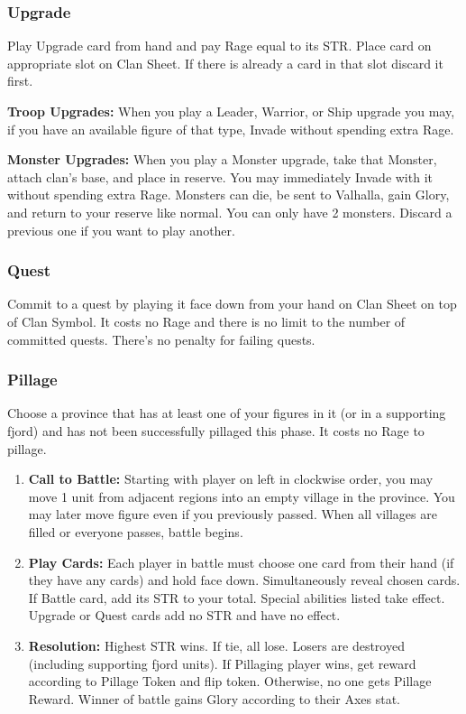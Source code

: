 \documentclass[12pt]{article}
\newenvironment{enumerateCustom}
{\begin{enumerate}
  \setlength{\itemsep}{1pt}
  \setlength{\parskip}{0pt}
  \setlength{\parsep}{0pt}}
{\end{enumerate}}
\begin{document}
\begin{multicols*}{2}
    \subsubsection*{Upgrade}
    Play Upgrade card from hand and pay Rage equal to its STR. Place card on appropriate slot on Clan Sheet. If there is already a card in that slot discard it first.

    \textbf{Troop Upgrades:} When you play a Leader, Warrior, or Ship upgrade you may, if you have an available figure of that type, Invade without spending extra Rage.

    \textbf{Monster Upgrades:} When you play a Monster upgrade, take that Monster, attach clan's base, and place in reserve. You may immediately Invade with it without spending extra Rage. Monsters can die, be sent to Valhalla, gain Glory, and return to your reserve like normal. You can only have 2 monsters. Discard a previous one if you want to play another.

    \subsubsection*{Quest}
    Commit to a quest by playing it face down from your hand on Clan Sheet on top of Clan Symbol. It costs no Rage and there is no limit to the number of committed quests. There's no penalty for failing quests.

    \subsubsection*{Pillage}
    Choose a province that has at least one of your figures in it (or in a supporting fjord) and has not been successfully pillaged this phase. It costs no Rage to pillage.

    \begin{enumerateCustom}
    \item \textbf{Call to Battle:} Starting with player on left in clockwise order, you may move 1 unit from adjacent regions into an empty village in the province. You may later move figure even if you previously passed. When all villages are filled or everyone passes, battle begins.
    \item \textbf{Play Cards:} Each player in battle must choose one card from their hand (if they have any cards) and hold face down. Simultaneously reveal chosen cards. If Battle card, add its STR to your total. Special abilities listed take effect. Upgrade or Quest cards add no STR and have no effect.
    \item \textbf{Resolution:} Highest STR wins. If tie, all lose. Losers are destroyed (including supporting fjord units). If Pillaging player wins, get reward according to Pillage Token and flip token. Otherwise, no one gets Pillage Reward. Winner of battle gains Glory according to their Axes stat.
    \end{enumerateCustom}


\end{multicols*}
\end{document}
